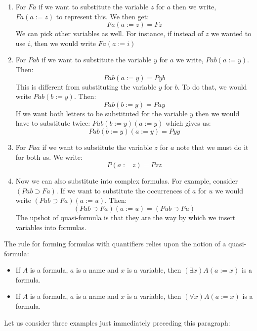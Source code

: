 \documentclass[
]{book}
\providecommand{\tightlist}{%
  \setlength{\itemsep}{0pt}\setlength{\parskip}{0pt}}
\begin{document}
\begin{enumerate}
\def\labelenumi{\arabic{enumi}.}
\item
  For \(Fa\) if we want to substitute the variable \(z\) for \(a\) then we write, \(Fa(a:=z)\) to represent this. We then get:
  \[
  Fa(a:=z) = Fz
  \]
  We can pick other variables as well. For instance, if instead of \(z\) we wanted to use \(i\), then we would write \(Fa(a:=i)\)
\item
  For \(Pab\) if we want to substitute the variable \(y\) for \(a\) we write, \(Pab(a:=y)\). Then:
  \[
  Pab(a:=y) = Pyb
  \]
  This is different from substituting the variable \(y\) for \(b\). To do that, we would write \(Pab(b:= y)\). Then:
  \[
  Pab(b:= y) = Pay
  \]
  If we want both letters to be substituted for the variable \(y\) then we would have to substitute twice: \(Pab(b:= y)(a:=y)\) which gives us:
  \[
  Pab(b:=y)(a:=y) = Pyy
  \]
\item
  For \(Paa\) if we want to substitute the variable \(z\) for \(a\) note that we must do it for both \(a\)s. We write:
  \[
  P(a:=z) = Pzz
  \]
\item
  Now we can also substitute into complex formulas. For example, consider \((Pab \supset Fa)\). If we want to substitute the occurrences of \(a\) for \(u\) we would write \((Pab \supset Fa) (a:=u)\). Then:
  \[
  (Pab\supset Fa)(a:= u) = (Pub\supset Fu)
  \]
  The upshot of quasi-formula is that they are the way by which we insert variables into formulas.
\end{enumerate}

The rule for forming formulas with quantifiers relies upon the notion of a quasi-formula:

\begin{itemize}
\tightlist
\item
  If \(A\) is a formula, \(a\) is a name and \(x\) is a variable, then \((\exists x)A(a:=x)\) is a formula.
\item
  If \(A\) is a formula, \(a\) is a name and \(x\) is a variable, then \((\forall x)A(a:=x)\) is a formula.
\end{itemize}

Let us consider three examples just immediately preceding this paragraph:
\end{document}
